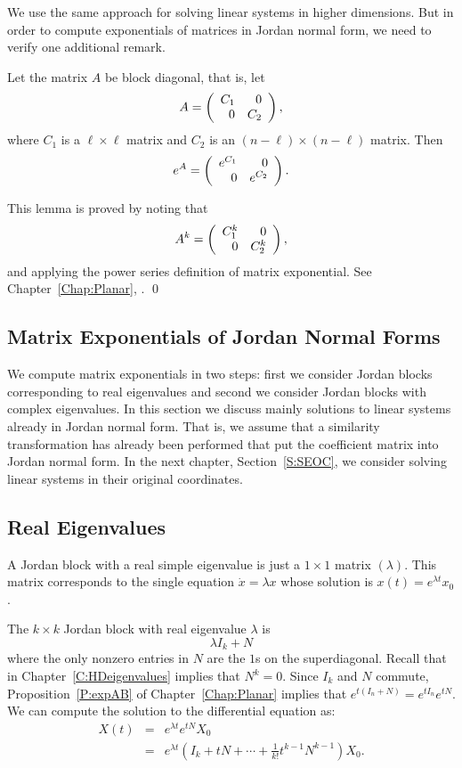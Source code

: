 We use the same approach for solving linear systems in higher dimensions.
But in order to compute exponentials of matrices in Jordan normal form,
we need to verify one additional remark.

\begin{lemma}  \label{T:blocks}
Let the matrix $A$ be block diagonal, that is, let
\[
A=\left(\begin{array}{rr} C_1 & 0\\ 0 &C_2\end{array}\right),
\]
where $C_1$ is a $\ell\times \ell$ matrix and $C_2$ is an 
$(n-\ell)\times(n-\ell)$ matrix.  Then 
\[
e^A = \left(\begin{array}{rr} e^{C_1} & 0\\ 0 &e^{C_2}\end{array}\right).
\]
\end{lemma}

\proof  This lemma is proved by noting that
\[
A^k = \left(\begin{array}{rr} C_1^k & 0\\ 0 &C_2^k\end{array}\right),
\]
and applying the power series definition of matrix exponential.  
See Chapter~\ref{Chap:Planar}, . \qed

\subsection*{Matrix Exponentials of Jordan Normal Forms}

We compute matrix exponentials in two steps: first we consider 
Jordan blocks corresponding to real eigenvalues and second we consider
Jordan blocks with complex eigenvalues.  In this section we discuss mainly
solutions to linear systems already in Jordan normal form.  That is, we 
assume that a similarity transformation has already been performed that put
the coefficient
matrix into Jordan normal form.  In the next chapter, Section~\ref{S:SEOC},
we consider solving linear systems in their original coordinates. 

\subsection*{Real Eigenvalues}

A Jordan block with a real simple eigenvalue is just a $1\times 1$ matrix
$(\lambda)$. This matrix corresponds to the single equation 
$\dot{x}=\lambda x$ whose solution is $x(t) = e^{\lambda t}x_0$.

The $k\times k$ Jordan block with real 
eigenvalue $\lambda$ is 
\[
\lambda I_k + N
\]
where the only nonzero entries in $N$ are the $1$s on the superdiagonal.  
Recall that  in Chapter~\ref{C:HDeigenvalues} implies that 
$N^k=0$.  Since $I_k$ and $N$ commute, Proposition~\ref{P:expAB} of 
Chapter~\ref{Chap:Planar} implies that $e^{t(I_n+N)}=e^{tI_n}e^{tN}$.  We 
can compute the solution to the differential equation as:
\begin{eqnarray}
X(t) & = & e^{\lambda t}e^{tN}X_0 \nonumber \\
& = & e^{\lambda t}\left(I_k+tN+\cdots+\frac{1}{k!}t^{k-1}N^{k-1}\right)X_0.
\label{e:expsoln}
\end{eqnarray}

